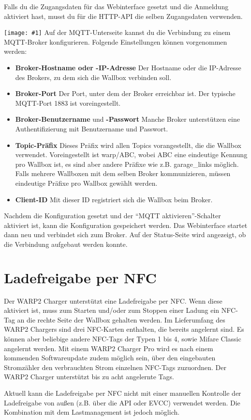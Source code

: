 \documentclass[a4paper,10pt]{article}
\newcommand{\hint}[1]{\begin{tcolorbox}[colback=boxgray,colframe=black,coltext=
white,title=Hinweis,left*=2mm,right*=2mm,boxsep=1mm,bottom=1mm,top=1mm]#1\end{tcolorbox}}
\newcommand{\gfx}[1]{\texttt{[image: \#1]}}
\begin{document}
\begin{multicols*}{2}
	Falls du die Zugangsdaten für das Webinterface gesetzt und die Anmeldung aktiviert hast, musst du
	für die HTTP-API die selben Zugangsdaten verwenden.

	\gfx{./img_warp2/resized/web_mqtt}
	Auf der MQTT-Unterseite kannst du die Verbindung zu einem MQTT-Broker konfigurieren. Folgende Einstellungen können vorgenommen werden:
	\begin{itemize}
		\item \textbf{Broker-Hostname oder -IP-Adresse} Der Host\-name oder die IP-Adresse des Brokers, zu dem sich die Wallbox verbinden soll.
		\item \textbf{Broker-Port} Der Port, unter dem der Broker erreichbar ist. Der typische MQTT-Port 1883 ist voreingestellt.
		\item \textbf{Broker-Benutzername} und \textbf{-Passwort} Manche Broker unterstützen eine Authentifizierung mit Benutzername und Passwort.
		\item \textbf{Topic-Präfix} Dieses Präfix wird allen Topics vorangestellt, die die Wallbox verwendet.
		      Voreingestellt ist warp/ABC, wobei ABC eine eindeutige Kennung pro Wallbox ist,
		      es sind aber andere Präfixe wie z.B. garage\_links möglich.
		      Falls mehrere Wallboxen mit dem selben Broker kommunizieren,
		      müssen eindeutige Präfixe pro Wallbox gewählt werden.
		\item \textbf{Client-ID} Mit dieser ID registriert sich die Wallbox beim Broker.
	\end{itemize}
	Nachdem die Konfiguration gesetzt und der \enquote{MQTT aktivieren}-Schalter aktiviert ist, kann die Konfiguration gespeichert werden.
	Das Webinterface startet dann neu und verbindet sich zum Broker.
	Auf der Status-Seite wird angezeigt, ob die Verbindung aufgebaut werden konnte.

	\newpage
	\section{Ladefreigabe per NFC}
	\label{NFC}
	Der WARP2 Charger unterstützt eine Ladefreigabe per NFC. Wenn diese aktiviert ist,
	muss zum Starten und/oder zum Stoppen einer Ladung ein NFC-Tag an die rechte Seite
	der Wallbox gehalten werden. Im Lieferumfang des WARP2 Chargers sind drei NFC-Karten enthalten,
	die bereits angelernt sind. Es können aber beliebige andere NFC-Tags der Typen 1 bis 4,
	sowie Mifare Classic angelernt werden. Mit einem WARP2 Charger Pro wird es nach einem
	kommenden Softwareupdate zudem möglich sein, über den eingebauten Stromzähler
	den verbrauchten Strom einzelnen NFC-Tags zuzuordnen.
	Der WARP2 Charger unterstützt bis zu acht angelernte Tags.
	\hint{Aktuell kann die Ladefreigabe per NFC nicht mit einer manuellen Kontrolle der
	Ladefreigabe von außen (z.B. über die API oder EVCC) verwendet werden.
	Die Kombination mit dem Lastmanagement ist jedoch möglich.}


\end{multicols*}
\end{document}

